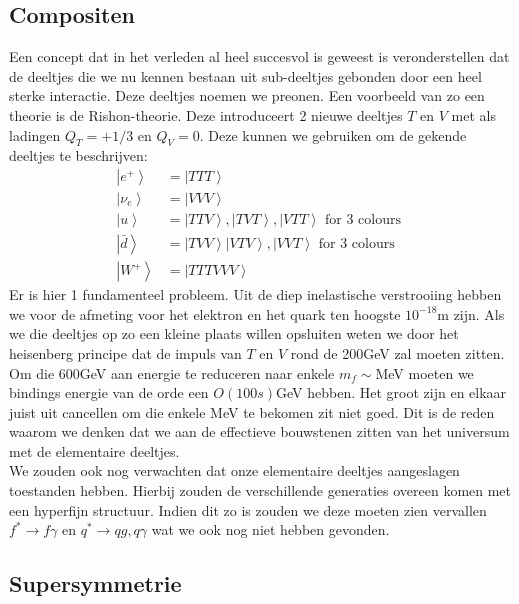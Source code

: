 \documentclass[../main.tex]{subfiles}
\begin{document}
\subsection{Compositen}%
\label{sub:compositen}

Een concept dat in het verleden al heel succesvol is geweest is veronderstellen dat de deeltjes die we nu kennen bestaan uit sub-deeltjes gebonden door een heel sterke interactie. Deze deeltjes noemen we preonen. Een voorbeeld van zo een theorie is de Rishon-theorie. Deze introduceert 2 nieuwe deeltjes $T$ en $V$ met als ladingen $Q_{T}=+1 / 3$ en $Q_{V}=0$. Deze kunnen we gebruiken om de gekende deeltjes te beschrijven:
\begin{equation}
    \begin{aligned}
        \label{eq:rischon_samenstelling}
        \left| e^{+}\right>&=\left| T T T\right>\\
        \left| \nu_{e}\right>&=\left| V V V\right>\\
        \left|u\right> &=\left|T T V\right>,\left| T V T\right>, \left| V T T\right>\text { for } 3 \text { colours } \\
        \left| \bar{d}\right>&=\left|T V V\right>\left| V T V\right>, \left| V V T\right>\text { for } 3 \text { colours } \\
        \left|W^{+}\right\rangle &=\left| T T T V V V\right>
    \end{aligned}
\end{equation}
Er is hier 1 fundamenteel probleem. Uit de diep inelastische verstrooiing hebben we voor de afmeting voor het elektron en het quark ten hoogste $10^{-18}$m zijn. Als we die deeltjes op zo een kleine plaats willen opsluiten weten we door het heisenberg principe dat de impuls van $T$ en $V$ rond de 200GeV zal moeten zitten. Om die 600GeV aan energie te reduceren naar enkele $m_f\sim$MeV moeten we bindings energie van de orde een $O(100s)$GeV hebben. Het groot zijn en elkaar juist uit cancellen om die enkele MeV te bekomen zit niet goed. Dit is de reden waarom we denken dat we aan de effectieve bouwstenen zitten van het universum met de elementaire deeltjes.\\
We zouden ook nog verwachten dat onze elementaire deeltjes aangeslagen toestanden hebben. Hierbij zouden de verschillende generaties overeen komen met een hyperfijn structuur. Indien dit zo is zouden we deze moeten zien vervallen $f^{*} \rightarrow f \gamma$ en $q^{*} \rightarrow q g, q \gamma$ wat we ook nog niet hebben gevonden.

\subsection{Supersymmetrie}%
\label{sub:supersymmetrie}
\end{document}
